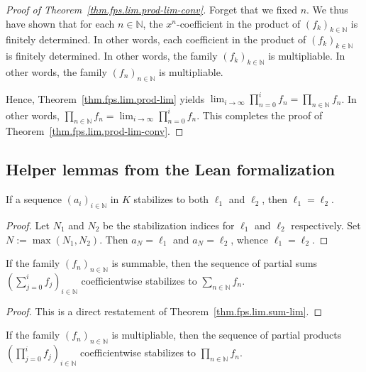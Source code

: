 \begin{proof}[Proof of Theorem~\ref{thm.fps.lim.prod-lim-conv}]
Forget that we fixed $n$. We thus have shown that for each
$n\in\mathbb{N}$, the $x^n$-coefficient in the product of
$(f_k)_{k\in\mathbb{N}}$ is finitely determined. In other words, each
coefficient in the product of $(f_k)_{k\in\mathbb{N}}$ is finitely
determined. In other words, the family $(f_k)_{k\in\mathbb{N}}$ is
multipliable. In other words, the family $(f_n)_{n\in\mathbb{N}}$ is
multipliable.

Hence, Theorem~\ref{thm.fps.lim.prod-lim} yields
$\lim_{i\to\infty} \prod_{n=0}^{i} f_n = \prod_{n\in\mathbb{N}} f_n$.
In other words,
$\prod_{n\in\mathbb{N}} f_n = \lim_{i\to\infty} \prod_{n=0}^{i} f_n$.
This completes the proof of Theorem~\ref{thm.fps.lim.prod-lim-conv}.
\end{proof}

\subsection{Helper lemmas from the Lean formalization}

\begin{lemma}
\label{lem.fps.lim.stab-unique-detail}
\leanhelper
\leanok
If a sequence $(a_i)_{i\in\mathbb{N}}$ in $K$ stabilizes to both
$\ell_1$ and $\ell_2$, then $\ell_1 = \ell_2$.
\end{lemma}

\begin{proof}
\leanok
Let $N_1$ and $N_2$ be the stabilization indices for $\ell_1$ and
$\ell_2$ respectively. Set $N := \max(N_1, N_2)$. Then
$a_N = \ell_1$ and $a_N = \ell_2$, whence $\ell_1 = \ell_2$.
\end{proof}

\begin{lemma}
\label{lem.fps.lim.partial-sum-detail}
\leanhelper
\leanok
If the family $(f_n)_{n\in\mathbb{N}}$ is summable, then the sequence of
partial sums $\left(\sum_{j=0}^{i} f_j\right)_{i\in\mathbb{N}}$
coefficientwise stabilizes to $\sum_{n\in\mathbb{N}} f_n$.
\end{lemma}

\begin{proof}
\leanok
This is a direct restatement of Theorem~\ref{thm.fps.lim.sum-lim}.
\end{proof}

\begin{lemma}
\label{lem.fps.lim.partial-prod-detail}
\leanhelper
\leanok
If the family $(f_n)_{n\in\mathbb{N}}$ is multipliable, then the
sequence of partial products
$\left(\prod_{j=0}^{i} f_j\right)_{i\in\mathbb{N}}$ coefficientwise
stabilizes to $\prod_{n\in\mathbb{N}} f_n$.
\end{lemma}

